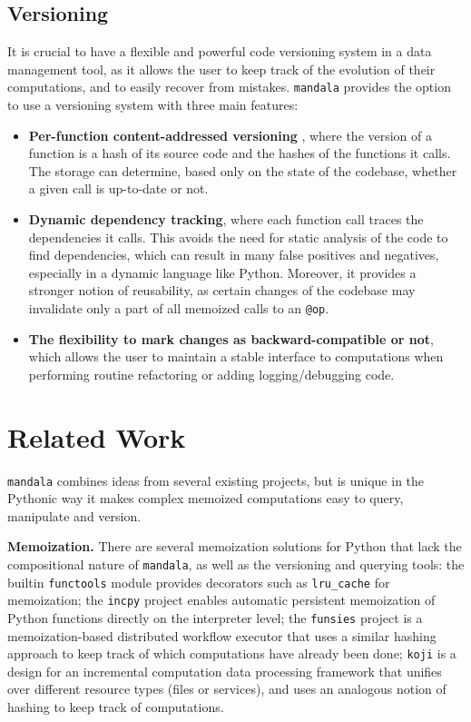 \subsection{Versioning}
\label{subsection:versioning}

It is crucial to have a flexible and powerful code versioning system in a data
management tool, as it allows the user to keep track of the evolution of their
computations, and to easily recover from mistakes. \texttt{mandala} provides the
option to use a versioning system with three main features:
\begin{itemize}
\item \textbf{Per-function content-addressed versioning} \citep{git,lozano2017unison}, where
the version of a function is a hash of its source code and the hashes of the
functions it calls. The storage can determine, based only on the state of the
codebase, whether a given call is up-to-date or not.
\item \textbf{Dynamic dependency tracking}, where each function call traces the
dependencies it calls. This avoids the need for static analysis of the code to
find dependencies, which can result in many false positives and negatives,
especially in a dynamic language like Python. Moreover, it provides a stronger
notion of reusability, as certain changes of the codebase may invalidate only
a part of all memoized calls to an \texttt{@op}.
\item \textbf{The flexibility to mark changes as backward-compatible or not},
which allows the user to maintain a stable interface to computations when performing routine refactoring or adding logging/debugging code.
\end{itemize}

\section{Related Work}
\label{section:related-work}

\texttt{mandala} combines ideas from several existing projects, but is unique in
the Pythonic way it makes complex memoized computations easy to query,
manipulate and version.

\textbf{Memoization.} There are several memoization solutions for Python that lack the compositional nature of \texttt{mandala}, as well as the versioning and
querying tools: the builtin \texttt{functools} module provides decorators such as \texttt{lru\_cache} for memoization; the \texttt{incpy} project \citep{guo2011using} enables automatic
persistent memoization of Python functions directly on the interpreter level;
the \texttt{funsies} project \citep{lavigne2021funsies} is a memoization-based
distributed workflow executor that uses a similar hashing approach to keep track
of which computations have already been done; \texttt{koji} \citep{maymounkov2018koji} is a design for an incremental computation data processing framework that unifies over different resource types (files or services), and uses an analogous notion of hashing to keep track of computations.

